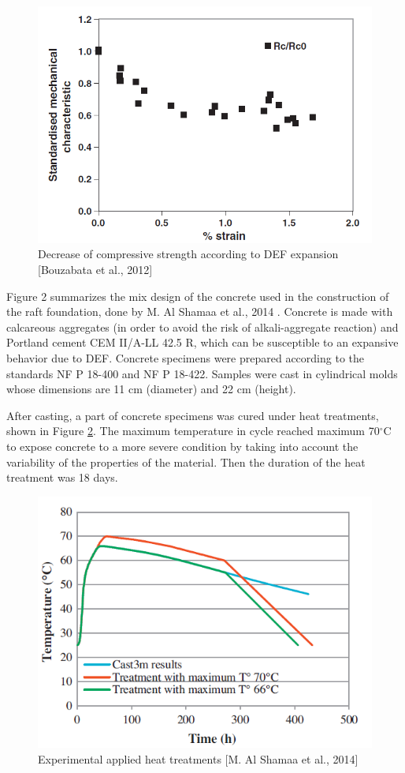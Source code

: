 \begin{figure}[h!]
  \centering
  \includegraphics[width=0.8\linewidth]{Reference/Bouzabata3.png}
  \caption{Decrease of compressive strength according to DEF expansion [Bouzabata et al., 2012]}
  \label{Bouzabata (2012)3}
\end{figure}


\clearpage

Figure 2 summarizes the mix design of the concrete used in the construction of the raft foundation, done by M. Al Shamaa et al., 2014 \cite{Shamaa}. Concrete is made with calcareous
aggregates (in order to avoid the risk of alkali-aggregate reaction) and Portland cement CEM II/A-LL 42.5 R, which can be susceptible to an expansive behavior due to DEF. Concrete specimens were prepared according to the standards NF P 18-400 and NF P 18-422. Samples were cast in cylindrical molds whose dimensions are 11 cm (diameter) and 22 cm (height).

After casting, a part of concrete specimens was cured under heat treatments, shown in Figure \ref{Shamaa1}. The maximum temperature in cycle reached maximum 70$^\circ$C to expose concrete to a more severe condition by taking into account the variability of the properties of the material. Then the duration of the heat treatment was 18 days.

\begin{figure}[h!]
  \centering
  \includegraphics[width=0.8\linewidth]{Reference/Shamaa1.png}
  \caption{Experimental applied heat treatments [M. Al Shamaa et al., 2014]}
  \label{Shamaa1}
\end{figure}

